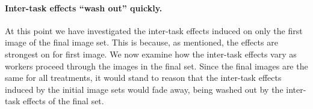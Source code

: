 \documentclass[letterpaper,twocolumn]{article}
\begin{document}
\paragraph{Inter-task effects ``wash out'' quickly.}  
\begin{figure}
\end{figure}
At this point we have 
investigated the inter-task effects induced on only the first image of the 
final image set.  This is because, as mentioned, the effects are strongest on 
for first image.  We now examine how the inter-task effects vary as workers 
proceed through the images in the final set.  Since the final images are the
same for all treatments, it would stand to reason that the inter-task effects
induced by the initial image sets would fade away, being washed out by the
inter-task effects of the final set.
\end{document}
